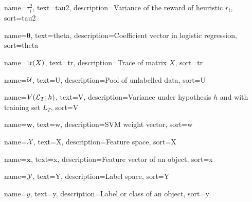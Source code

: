 %
{%
    name={$\tau_i^2$},
    text={tau2},
    description={Variance of the reward of heuristic $r_i$},
    sort={tau2}
}

%
{%
    name={$\bm{\theta}$},
    text={theta},
    description={Coefficient vector in logistic regression},
    sort={theta}
}

%
{%
    name={$\operatorname{tr}(X)$},
    text={tr},
    description={Trace of matrix $X$},
    sort={tr}
}


%
{%
	name={$\mathcal{U}$},
	text={U},
	description={Pool of unlabelled data},
	sort={U}
}

%
{%
    name={$V(\mathcal{L}_T; h)$},
    text={V},
    description={Variance under hypothesis $h$ and with training set $L_T$},
    sort={V}
}


%
{%
    name={$\bm{w}$},
    text={w},
    description={SVM weight vector},
    sort={w}
}

%
{%
	name={$\mathcal{X}$},
	text={X},
	description={Feature space},
	sort={X}
}

%
{%
	name={$\bm{x}$},
	text={x},
	description={Feature vector of an object},
	sort={x}
}

%
{%
	name={$\mathcal{Y}$},
	text={Y},
	description={Label space},
	sort={Y}
}

%
{%
	name={$y$},
	text={y},
	description={Label or class of an object},
	sort={y}
}



